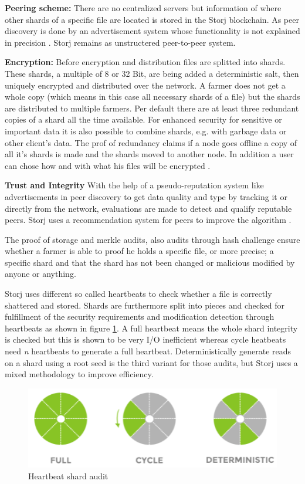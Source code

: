 \textbf{Peering scheme:} There are no centralized servers but information of where other shards of a specific file are located is stored in the Storj blockchain. As peer discovery is done by an advertisement system whose functionality is not explained in precision \cite{storj:PDF}. Storj remains as unstructered peer-to-peer system.

\textbf{Encryption:} Before encryption and distribution files are splitted into shards. These shards, a multiple of 8 or 32 Bit, are being added a deterministic salt, then uniquely encrypted and distributed over the network. A farmer does not get a whole copy (which means in this case all necessary shards of a file) but the shards are distributed to multiple farmers. Per default there are at least three redundant copies of a shard all the time available. For enhanced security for sensitive or important data it is also possible to combine shards, e.g. with garbage data or other client's data. The prof of redundancy claims if a node goes offline a copy of all it's shards is made and the shards moved to another node. In addition a user can chose how and with what his files will be encrypted  \cite{storj:PDF}.

\textbf{Trust and Integrity} With the help of a pseudo-reputation system like advertisements in peer discovery to get data quality and type by tracking it or directly from the network, evaluations are made to detect and qualify reputable peers. Storj uses a recommendation system for peers to improve the algorithm \cite{storj:PDF}.

The proof of storage and merkle audits, also audits through hash challenge ensure whether a farmer is able to proof he holds a specific file, or more precise; a specific shard and that the shard has not been changed or malicious modified by anyone or anything.

Storj uses different so called heartbeats to check whether a file is correctly shattered and stored. Shards are furthermore split into pieces and checked for fulfillment of the security requirements and modification detection through heartbeats as shown in figure \ref{storj_heartbeat}. A full heartbeat means the whole shard integrity is checked but this is shown to be very I/O inefficient whereas cycle heatbeats need \textsl{n} heartbeats to generate a full heartbeat. Deterministically generate reads on a shard using a root seed is the third variant for those audits, but Storj uses a mixed methodology to improve efficiency.

	\begin{figure}[ht]
		\begin{center}
		\includegraphics[scale=0.8]{Talk5/storj_heartbeat.PNG}
		\end{center}
		\caption{Heartbeat shard audit \cite{storj:PDF}}
		\label{storj_heartbeat}
	\end{figure}

